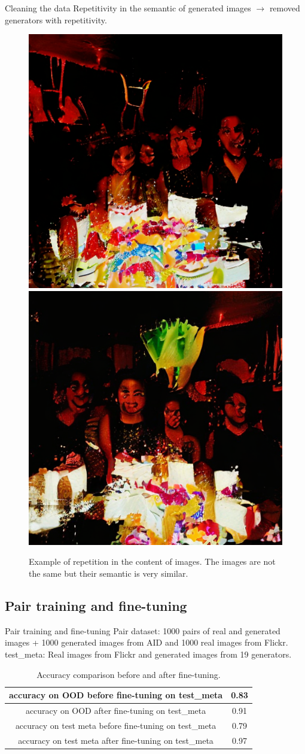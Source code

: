 \documentclass[11pt,compress]{beamer} %
\begin{document}
\begin{frame}{Cleaning the data}
  \centering
  Repetitivity in the semantic of generated images $\rightarrow$ removed generators with repetitivity.
  \begin{figure}[H]
    \centering
    \includegraphics[width=.4\textwidth]{img/birthday1.png}
    \includegraphics[width=.4\textwidth]{img/birthday2.png}
    \caption{Example of repetition in the content of images. The images are not the same but their semantic is very similar.}
    \label{fig:repetition}
  \end{figure}
\end{frame}

\subsection{Pair training and fine-tuning}
\begin{frame}{Pair training and fine-tuning}
  Pair dataset: 1000 pairs of real and generated images + 1000 generated images from AID and 1000 real images from Flickr.\\
  test\_meta: Real images from Flickr and generated images from 19 generators.
  \begin{table}[H]
    \centering
    \begin{tabular}{|c|c|}
        \hline
        accuracy on OOD before fine-tuning on test\_meta & 0.83 \\
        \hline
        accuracy on OOD after fine-tuning on test\_meta & 0.91 \\
        \hline
        accuracy on test meta before fine-tuning on test\_meta & 0.79 \\
        \hline
        accuracy on test meta after fine-tuning on test\_meta & 0.97 \\
        \hline
    \end{tabular}
    \caption{Accuracy comparison before and after fine-tuning.}
    \label{tab:fine-tuning}
\end{table}
\end{frame}
\end{document}
